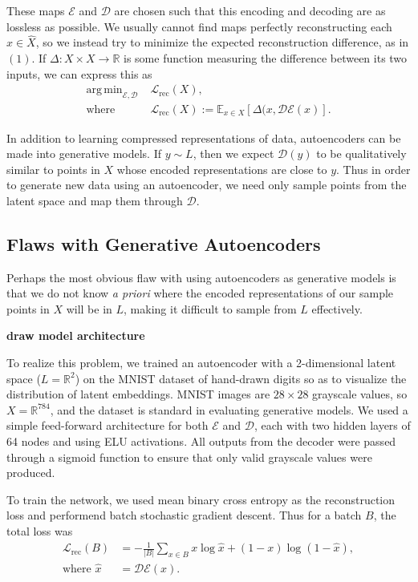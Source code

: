 \documentclass[conference]{IEEEtran}
\newcommand{\warn}[1]{\textbf{\color{red}#1}}
\newcommand{\R}{\mathbb{R}}
\DeclareMathOperator*{\argmin}{arg\,min}
\begin{document}
These maps $\mathcal{E}$ and $\mathcal{D}$ are chosen such that this encoding and decoding are as lossless as possible. We usually cannot find maps perfectly reconstructing each $x \in \hat{X}$, so we instead try to minimize the expected reconstruction difference, as in $(1)$. If $\Delta:X\times X\to \R$ is some function measuring the difference between its two inputs, we can express this as
\begin{align*}
	\argmin_{\mathcal{E}, \mathcal{D}} \; &\mathcal{L}_{\text{rec}}(X), \\
	\text{where } &\mathcal{L}_{\text{rec}}(X) := \mathbb{E}_{x \in X}\left[ \Delta(x, \mathcal{D}\mathcal{E}(x) \right].
\end{align*}

In addition to learning compressed representations of data, autoencoders can be made into generative models. If $y \sim L$, then we expect $\mathcal{D}(y)$ to be qualitatively similar to points in $X$ whose encoded representations are close to $y$. Thus in order to generate new data using an autoencoder, we need only sample points from the latent space and map them through $\mathcal{D}$.


\subsection{Flaws with Generative Autoencoders}
\label{ae-flaws}

Perhaps the most obvious flaw with using autoencoders as generative models is that we do not know \textit{a priori} where the encoded representations of our sample points in $X$ will be in $L$, making it difficult to sample from $L$ effectively.

\warn{draw model architecture}

To realize this problem, we trained an autoencoder with a 2-dimensional latent space ($L=\R^{2}$) on the MNIST dataset of hand-drawn digits so as to visualize the distribution of latent embeddings. MNIST images are $28 \times 28$ grayscale values, so $X = \R^{784}$, and the dataset is standard in evaluating generative models. We used a simple feed-forward architecture for both $\mathcal{E}$ and $\mathcal{D}$, each with two hidden layers of 64 nodes and using ELU activations. All outputs from the decoder were passed through a sigmoid function to ensure that only valid grayscale values were produced.

To train the network, we used mean binary cross entropy as the reconstruction loss and performend batch stochastic gradient descent. Thus for a batch $B$, the total loss was
\begin{align*}
	\mathcal{L}_{\text{rec}}(B) &= - \frac{1}{|B|} \sum_{x \in B} x \log \hat{x} + (1-x) \log(1-\hat{x}), \\
	\text{where } \hat{x} &= \mathcal{D}\mathcal{E}(x).
\end{align*}
\end{document}
